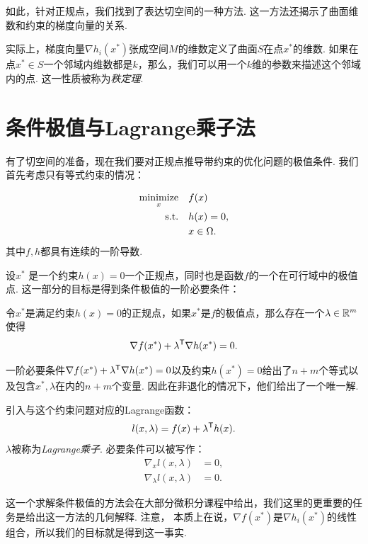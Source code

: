 如此，针对正规点，我们找到了表达切空间的一种方法. 这一方法还揭示了曲面维数和约束的梯度向量的关系.

\begin{remark}
    实际上，梯度向量$\nabla h_i(x^*)$张成空间$M$的维数定义了曲面$S$在点$x^*$的维数. 如果在点$x^*\in S$一个邻域内维数都是$k$，那么，我们可以用一个$k$维的参数来描述这个邻域内的点. 这一性质被称为\textit{秩定理}.
\end{remark}

\section{条件极值与Lagrange乘子法}\label{sec:lagrange-multiplier}

有了切空间的准备，现在我们要对正规点推导带约束的优化问题的极值条件. 我们首先考虑只有等式约束的情况：

\begin{equation}
\begin{aligned}
\operatorname*{minimize}_x\quad& f(x) \\
\text{s.t.}\quad& {h}(x)={0},\\
& x \in \Omega.
\end{aligned}    \label{eq:eq-constraint-only-differentiable}
\end{equation}
其中$f,h$都具有连续的一阶导数.

设$x^*$ 是一个约束$h(x)=0$一个正规点，同时也是函数$f$的一个在可行域中的极值点. 这一部分的目标是得到条件极值的一阶必要条件：
\begin{theorem}[条件极值的一阶必要条件]\label{thm:eq-opt-cond-1}
    令$x^*$是满足约束${h(x)=0}$的正规点，如果$x^*$是$f$的极值点，那么存在一个${\lambda}\in \mathbb{R}^m$使得
    \[\nabla f(x^*)+{\lambda^{\mathsf{T}} \nabla h(x^*)=0}. \]
\end{theorem}

一阶必要条件$\nabla f(x^*)+{\lambda^{\mathsf{T}}}\nabla {h(x^*)=0}$以及约束${h(x^*)=0}$给出了$n+m$个等式以及包含${x^*,\lambda}$在内的$n+m$个变量. 因此在非退化的情况下，他们给出了一个唯一解. 

引入与这个约束问题对应的Lagrange函数：
        \[l({x,\lambda})=f(x)+{\lambda^{\mathsf{T}} h(x)}.\]
$\lambda$被称为\textit{Lagrange乘子}. 必要条件可以被写作：
\begin{align*}
    \nabla_x l({x,\lambda})&=0,\\
    \nabla_{\lambda} l({x,\lambda})&=0.
\end{align*}

这一个求解条件极值的方法会在大部分微积分课程中给出，我们这里的更重要的任务是给出这一方法的几何解释. 注意， 本质上在说，$\nabla f(x^*)$是$\nabla h_i(x^*)$的线性组合，所以我们的目标就是得到这一事实. 

